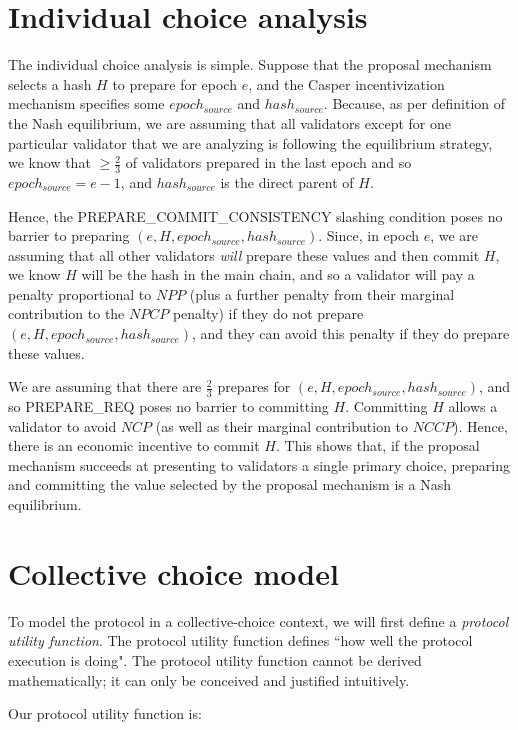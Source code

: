 \documentclass[12pt]{article}
\begin{document}
\section{Individual choice analysis}

The individual choice analysis is simple. Suppose that the proposal mechanism selects a hash $H$ to prepare for epoch $e$, and the Casper incentivization mechanism specifies some $epoch_{source}$ and $hash_{source}$. Because, as per definition of the Nash equilibrium, we are assuming that all validators except for one particular validator that we are analyzing is following the equilibrium strategy, we know that $\ge \frac{2}{3}$ of validators prepared in the last epoch and so $epoch_{source} = e - 1$, and $hash_{source}$ is the direct parent of $H$.

Hence, the PREPARE\_COMMIT\_CONSISTENCY slashing condition poses no barrier to preparing $(e, H, epoch_{source}, hash_{source})$. Since, in epoch $e$, we are assuming that all other validators \textit{will} prepare these values and then commit $H$, we know $H$ will be the hash in the main chain, and so a validator will pay a penalty proportional to $NPP$ (plus a further penalty from their marginal contribution to the $NPCP$ penalty) if they do not prepare $(e, H, epoch_{source}, hash_{source})$, and they can avoid this penalty if they do prepare these values.

We are assuming that there are $\frac{2}{3}$ prepares for $(e, H, epoch_{source}, hash_{source})$, and so PREPARE\_REQ poses no barrier to committing $H$. Committing $H$ allows a validator to avoid $NCP$ (as well as their marginal contribution to $NCCP$). Hence, there is an economic incentive to commit $H$. This shows that, if the proposal mechanism succeeds at presenting to validators a single primary choice, preparing and committing the value selected by the proposal mechanism is a Nash equilibrium.

\section{Collective choice model}

To model the protocol in a collective-choice context, we will first define a \textit{protocol utility function}. The protocol utility function defines ``how well the protocol execution is doing". The protocol utility function cannot be derived mathematically; it can only be conceived and justified intuitively.

Our protocol utility function is:
\end{document}
